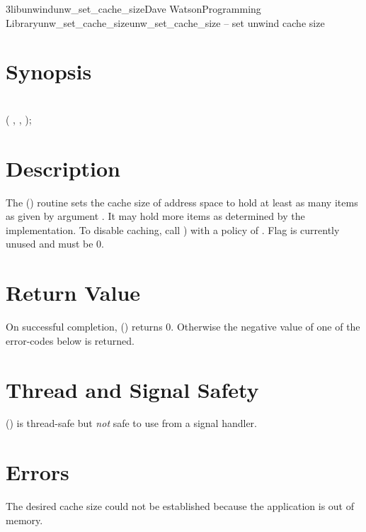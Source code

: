 \documentclass{article}
\begin{document}
\begin{Name}{3libunwind}{unw\_set\_cache\_size}{Dave Watson}{Programming Library}{unw\_set\_cache\_size}unw\_set\_cache\_size -- set unwind cache size
\end{Name}

\section{Synopsis}

\\

 ( ,  ,  );\\

\section{Description}

The () routine sets the cache size of
address space  to hold at least as many items as given by
argument .  It may hold more items as determined by the
implementation.  To disable caching, call
) with a policy of
.  Flag is currently unused and must be 0.

\section{Return Value}

On successful completion, () returns 0.
Otherwise the negative value of one of the error-codes below is
returned.

\section{Thread and Signal Safety}

() is thread-safe but \emph{not} safe
to use from a signal handler.

\section{Errors}

\begin{Description}
\item[\Const{UNW\_ENOMEM}] The desired cache size could not be
  established because the application is out of memory.
\end{Description}
\end{document}
